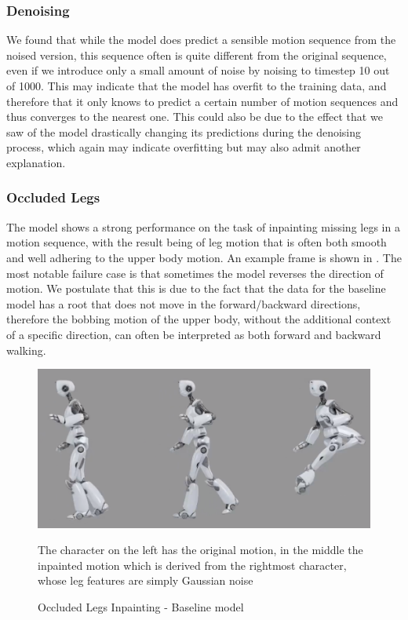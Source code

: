 \subsubsection{Denoising}
We found that while the model does predict a sensible motion sequence from the noised version, this sequence often is quite different from the original sequence, even if we introduce only a small amount of noise by noising to timestep 10 out of 1000. This may indicate that the model has overfit to the training data, and therefore that it only knows to predict a certain number of motion sequences and thus converges to the nearest one. This could also be due to the effect that we saw of the model drastically changing its predictions during the denoising process, which again may indicate overfitting but may also admit another explanation.

\subsubsection{Occluded Legs}
The model shows a strong performance on the task of inpainting missing legs in a motion sequence, with the result being of leg motion that is often both smooth and well adhering to the upper body motion. An example frame is shown in . 
The most notable failure case is that sometimes the model reverses the direction of motion. We postulate that this is due to the fact that the data for the baseline model has a root that does not move in the forward/backward directions, therefore the bobbing motion of the upper body, without the additional context of a specific direction, can often be interpreted as both forward and backward walking.

\begin{figure}[!ht]
    \centering
    \includegraphics[width=1\textwidth]{Figures/diffusion/results/basline_inpainting_legs.png}
    \caption{Occluded Legs Inpainting - Baseline model}
    \label{fig:baseline_occluded_legs}
    \medskip
    \small
    \raggedright
    The character on the left has the original motion, in the middle the inpainted motion which is derived from the rightmost character, whose leg features are simply Gaussian noise
\end{figure}

